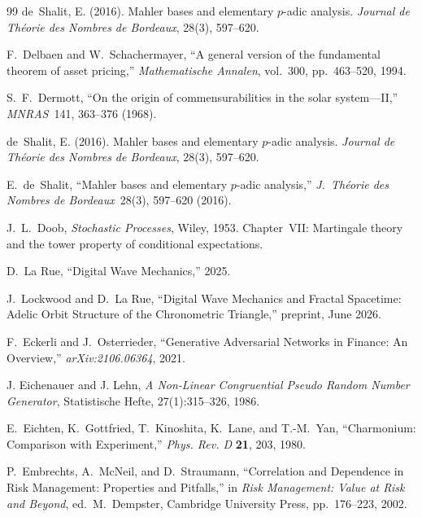 \documentclass[12pt,oneside]{book}
\theoremstyle{principia}
\theoremstyle{definition}
\theoremstyle{remark}
\begin{document}
\begin{thebibliography}{99}
de~Shalit, E. (2016).
Mahler bases and elementary $p$-adic analysis.
\textit{Journal de Th\'eorie des Nombres de Bordeaux}, 28(3), 597--620.

F.~Delbaen and W.~Schachermayer,
``A general version of the fundamental theorem of asset pricing,''
\emph{Mathematische Annalen}, vol.~300, pp.~463--520, 1994.

S.~F.~Dermott, ``On the origin of commensurabilities in the solar system---II,'' \emph{MNRAS}\ 141, 363--376 (1968).

de~Shalit, E. (2016).
Mahler bases and elementary $p$-adic analysis.
\emph{Journal de Th\'eorie des Nombres de Bordeaux}, 28(3), 597--620.

E.~de~Shalit, ``Mahler bases and elementary $p$-adic analysis,'' \emph{J.\ Th\'eorie des Nombres de Bordeaux}\ 28(3), 597--620 (2016).

J.~L.~Doob,
\emph{Stochastic Processes},
Wiley, 1953.
Chapter~VII: Martingale theory and the tower property of conditional expectations.

D.~La Rue,
``Digital Wave Mechanics,'' 2025.

J.~Lockwood and D.~La Rue, ``Digital Wave Mechanics and Fractal Spacetime: Adelic Orbit Structure of the Chronometric Triangle,'' preprint, June 2026.

F.~Eckerli and J.~Osterrieder,
``Generative Adversarial Networks in Finance: An Overview,''
\emph{arXiv:2106.06364}, 2021.

J. Eichenauer and J. Lehn,
\textit{A Non-Linear Congruential Pseudo Random Number Generator},
Statistische Hefte, 27(1):315--326, 1986.

E.~Eichten, K.~Gottfried, T.~Kinoshita, K.~Lane, and T.-M.~Yan, ``Charmonium: Comparison with Experiment,'' \emph{Phys. Rev. D} \textbf{21}, 203, 1980.

P.~Embrechts, A.~McNeil, and D.~Straumann,
``Correlation and Dependence in Risk Management: Properties and Pitfalls,''
in \emph{Risk Management: Value at Risk and Beyond}, ed.\ M.~Dempster,
Cambridge University Press, pp.~176--223, 2002.



\end{thebibliography}
\end{document}
